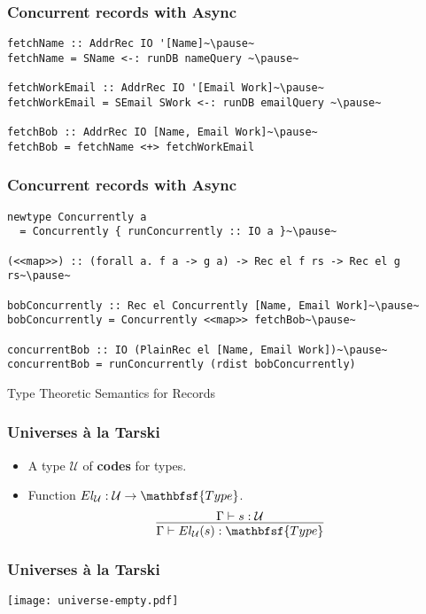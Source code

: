 \documentclass[tikz, 12pt]{beamer}
\def\Type{\mathbfsf{Type}}
\begin{document}
\begin{frame}[fragile]
  \frametitle{Concurrent records with Async}\pause

  \begin{lstlisting}
fetchName :: AddrRec IO '[Name]~\pause~
fetchName = SName <-: runDB nameQuery ~\pause~

fetchWorkEmail :: AddrRec IO '[Email Work]~\pause~
fetchWorkEmail = SEmail SWork <-: runDB emailQuery ~\pause~

fetchBob :: AddrRec IO [Name, Email Work]~\pause~
fetchBob = fetchName <+> fetchWorkEmail
  \end{lstlisting}
\end{frame}

\begin{frame}[fragile]
  \frametitle{Concurrent records with Async}\pause

  \begin{lstlisting}
newtype Concurrently a
  = Concurrently { runConcurrently :: IO a }~\pause~

(<<map>>) :: (forall a. f a -> g a) -> Rec el f rs -> Rec el g rs~\pause~

bobConcurrently :: Rec el Concurrently [Name, Email Work]~\pause~
bobConcurrently = Concurrently <<map>> fetchBob~\pause~

concurrentBob :: IO (PlainRec el [Name, Email Work])~\pause~
concurrentBob = runConcurrently (rdist bobConcurrently)
  \end{lstlisting}
\end{frame}

\begin{frame}[fragile]
  \centerline{Type Theoretic Semantics for Records}
\end{frame}

\begin{frame}
  \frametitle{Universes \`a la Tarski}\pause
  \begin{itemize}
    \item A type $\mathcal{U}$ of \textbf{codes} for types.
      \pause
    \item Function $El_\mathcal{U} : \mathcal{U}\to\Type$.
      \pause
      \[
        \infer{
          \Gamma\vdash El_\mathcal{U}(s) : \Type
        }{
          \Gamma\vdash s : \mathcal{U}
        }
      \]
  \end{itemize}
\end{frame}

\begin{frame}
  \frametitle{Universes \`a la Tarski}
  \begin{center}
    \texttt{[image: universe-empty.pdf]}
  \end{center}
\end{frame}
\end{document}

